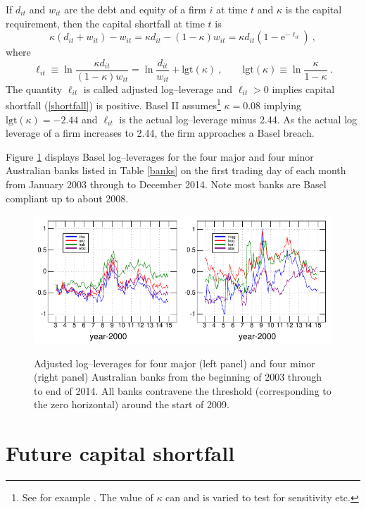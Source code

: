 \documentclass[authoryear]{elsarticle}
\newcommand{\logit}{\mathrm{lgt}}
\newcommand{\e}{\mathrm{e}}
\newcommand{\eref}[1]{(\ref{#1})}
\newcommand{\fref}[1]{Figure \ref{#1}}
\newcommand{\tref}[1]{Table \ref{#1}}
\newcommand{\cq}{\ , \qquad}
\newcommand{\be}[1]{\begin{equation}\label{#1}}
\newcommand{\ee}{\end{equation}}
\begin{document}
If $d_{it}$ and $w_{it}$ are the debt and equity of a firm $i$ at time $t$ and $\kappa$ is the capital requirement,  then the capital shortfall at time $t$ is 
\be{shortfall}
\kappa(d_{it}+w_{it}) - w_{it} = \kappa d_{it}  - (1-\kappa) w_{it} = \kappa d_{it}\left(1-\e^{-\ell_{it}}\right)\ ,
\ee
where 
$$
\ell_{it} \equiv  \ln\frac{\kappa d_{it}}{(1-\kappa)w_{it}}= \ln\frac{d_{it}}{w_{it}}+\logit(\kappa) \cq \logit(\kappa)\equiv \ln \frac{\kappa}{1-\kappa} \ .
$$
The quantity $\ell_{it}$ is called   adjusted log--leverage and $\ell_{it}>0$ implies capital shortfall \eref{shortfall} is positive.
Basel II assumes\footnote{See for example \cite{brownlees2015}.   The value of $\kappa$ can and is varied to test for sensitivity etc.} 
 $\kappa=0.08$ implying $\logit(\kappa)=-2.44$ and  $\ell_{it}$ is the actual log--leverage minus 2.44.   
As the actual  log leverage of a firm  increases to 2.44, the firm approaches a Basel breach. 

\fref{Bloglev} displays Basel log--leverages for the four major and four minor Australian banks listed in \tref{banks} on the first trading day of each month from January 2003  through to December 2014.  Note most banks are Basel compliant up to about 2008.

\begin{figure}[htbp]
\begin{center}
\label{Bloglev}
\includegraphics{figures/bloglev.pdf}
\caption{Adjusted log--leverages for four major (left panel) and four minor (right panel) Australian banks from the beginning of 2003 through to end of 2014.  All banks contravene the threshold (corresponding to the zero horizontal) around the start of 2009.}
\end{center}
\end{figure}


\section{Future capital shortfall}
\end{document}
